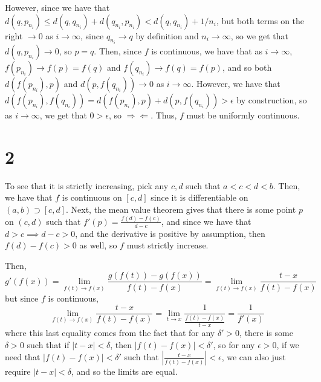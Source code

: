 \documentclass[12pt,letterpaper]{article}
\theoremstyle{definition}
\newcommand{\contra}{\Rightarrow\!\Leftarrow}
\begin{document}
However, since we have that $d(q, p_{n_{i}}) \leq d(q, q_{n_{i}}) + d(q_{n_{i}}, p_{n_{i}}) < d(q,q_{n_{i}}) + 1/n_{i}$, but both terms on the right $\rightarrow 0$ as $i \rightarrow \infty$, since $q_{n_{i}} \rightarrow q$ by definition and $n_{i} \rightarrow \infty$, so we get that $d(q, p_{n_{i}}) \rightarrow 0$, so $p = q$. Then, since $f$ is continuous, we have that as $i \rightarrow \infty$, $f(p_{n_{i}}) \rightarrow f(p) = f(q)$ and $f(q_{n_{i}}) \rightarrow f(q) = f(p)$, and so both $d(f(p_{n_{i}}), p)$ and $d(p, f(q_{n_{i}})) \rightarrow 0$ as $i \rightarrow \infty$. However, we have that $d(f(p_{n_{i}}), f(q_{n_{i}}))  = d(f(p_{n_{i}}), p) + d(p, f(q_{n_{i}})) > \epsilon$ by construction, so as $i \rightarrow \infty$, we get that $0 > \epsilon$, so $\contra$. Thus, $f$ must be uniformly continuous.

\section*{2}



To see that it is strictly increasing, pick any $c,d$ such that $a < c < d < b$. Then, we have that $f$ is continuous on $[c,d]$ since it is differentiable on $(a,b) \supset [c,d]$. Next, the mean value theorem gives that there is some point $p$ on $(c,d)$ such that $f'(p) = \frac{f(d) - f(c)}{d - c}$, and since we have that $d > c \implies d - c > 0$, and the derivative is positive by assumption, then $f(d) - f(c) > 0$ as well, so $f$ must strictly increase.

Then,
\[
  g'(f(x)) = \lim_{f(t) \rightarrow f(x)}\frac{g(f(t)) - g(f(x))}{f(t) - f(x)} = \lim_{f(t) \rightarrow f(x)}\frac{t - x}{f(t) - f(x)}
\]
but since $f$ is continuous,
\[
  \lim_{f(t) \rightarrow f(x)}\frac{t - x}{f(t) - f(x)} = \lim_{t \rightarrow x}\frac{1}{\frac{f(t)-f(x)}{t-x}} = \frac{1}{f'(x)}
\]
where this last equality comes from the fact that for any $\delta' > 0$, there is some $\delta > 0$ such that if $|t - x| < \delta$, then $|f(t) - f(x)| < \delta'$, so for any $\epsilon > 0$, if we need that $|f(t) - f(x)| < \delta'$ such that $\left|\frac{t-x}{f(t)-f(x)}\right| < \epsilon$, we can also just require $|t - x| < \delta$, and so the limits are equal.
\end{document}
